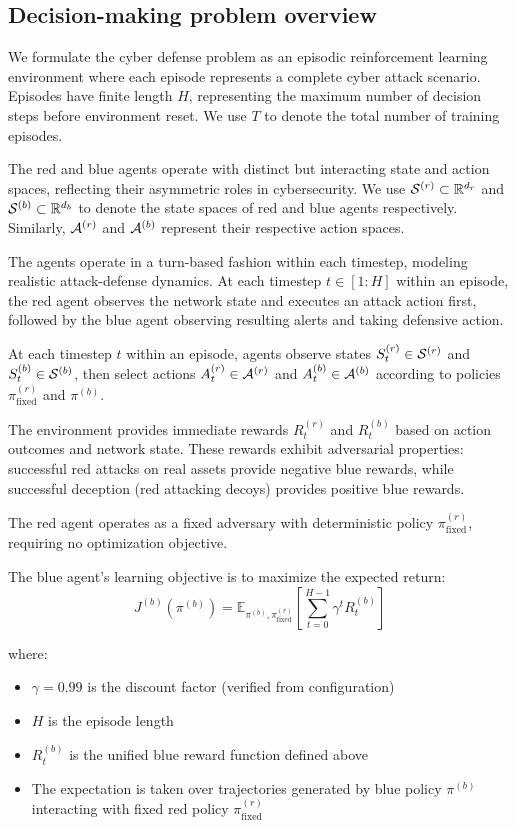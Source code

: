 \documentclass[12pt,twoside]{article}
\theoremstyle{definition}
\theoremstyle{plain}
\begin{document}
\subsection{Decision-making problem overview}

We formulate the cyber defense problem as an episodic reinforcement learning environment where each episode represents a complete cyber attack scenario. Episodes have finite length $H$, representing the maximum number of decision steps before environment reset. We use $T$ to denote the total number of training episodes.

The red and blue agents operate with distinct but interacting state and action spaces, reflecting their asymmetric roles in cybersecurity. We use $\mathcal{S}^{(r)} \subset \mathbb{R}^{d_r}$ and $\mathcal{S}^{(b)} \subset \mathbb{R}^{d_b}$ to denote the state spaces of red and blue agents respectively. Similarly, $\mathcal{A}^{(r)}$ and $\mathcal{A}^{(b)}$ represent their respective action spaces.

The agents operate in a turn-based fashion within each timestep, modeling realistic attack-defense dynamics. At each timestep $t \in [1:H]$ within an episode, the red agent observes the network state and executes an attack action first, followed by the blue agent observing resulting alerts and taking defensive action.

At each timestep $t$ within an episode, agents observe states $S_t^{(r)} \in \mathcal{S}^{(r)}$ and $S_t^{(b)} \in \mathcal{S}^{(b)}$, then select actions $A_t^{(r)} \in \mathcal{A}^{(r)}$ and $A_t^{(b)} \in \mathcal{A}^{(b)}$ according to policies $\pi^{(r)}_{\text{fixed}}$ and $\pi^{(b)}$.

The environment provides immediate rewards $R_t^{(r)}$ and $R_t^{(b)}$ based on action outcomes and network state. These rewards exhibit adversarial properties: successful red attacks on real assets provide negative blue rewards, while successful deception (red attacking decoys) provides positive blue rewards.

The red agent operates as a fixed adversary with deterministic policy $\pi^{(r)}_{\text{fixed}}$, requiring no optimization objective.

The blue agent's learning objective is to maximize the expected return:
\begin{equation}
J^{(b)}(\pi^{(b)}) = \mathbb{E}_{\pi^{(b)}, \pi^{(r)}_{\text{fixed}}}\left[\sum_{t=0}^{H-1} \gamma^t R_t^{(b)}\right]
\end{equation}

where:
\begin{itemize}
\item $\gamma = 0.99$ is the discount factor (verified from configuration)
\item $H$ is the episode length 
\item $R_t^{(b)}$ is the unified blue reward function defined above
\item The expectation is taken over trajectories generated by blue policy $\pi^{(b)}$ interacting with fixed red policy $\pi^{(r)}_{\text{fixed}}$
\end{itemize}
\end{document}
